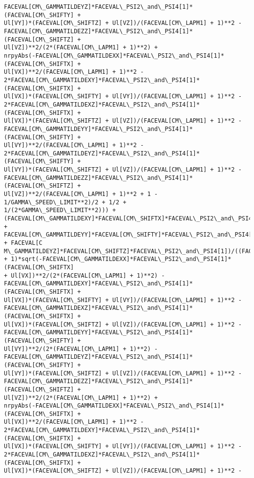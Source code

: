 \documentclass[landscape,letterpaper,10pt,english]{article}
\begin{document}
\begin{Verbatim}[commandchars=\\\{\}]
FACEVAL[CM\_GAMMATILDEYZ]*FACEVAL\_PSI2\_and\_PSI4[1]*(FACEVAL[CM\_SHIFTY] +
Ul[VY])*(FACEVAL[CM\_SHIFTZ] + Ul[VZ])/(FACEVAL[CM\_LAPM1] + 1)**2 -
FACEVAL[CM\_GAMMATILDEZZ]*FACEVAL\_PSI2\_and\_PSI4[1]*(FACEVAL[CM\_SHIFTZ] +
Ul[VZ])**2/(2*(FACEVAL[CM\_LAPM1] + 1)**2) +
nrpyAbs(-FACEVAL[CM\_GAMMATILDEXX]*FACEVAL\_PSI2\_and\_PSI4[1]*(FACEVAL[CM\_SHIFTX] +
Ul[VX])**2/(FACEVAL[CM\_LAPM1] + 1)**2 -
2*FACEVAL[CM\_GAMMATILDEXY]*FACEVAL\_PSI2\_and\_PSI4[1]*(FACEVAL[CM\_SHIFTX] +
Ul[VX])*(FACEVAL[CM\_SHIFTY] + Ul[VY])/(FACEVAL[CM\_LAPM1] + 1)**2 -
2*FACEVAL[CM\_GAMMATILDEXZ]*FACEVAL\_PSI2\_and\_PSI4[1]*(FACEVAL[CM\_SHIFTX] +
Ul[VX])*(FACEVAL[CM\_SHIFTZ] + Ul[VZ])/(FACEVAL[CM\_LAPM1] + 1)**2 -
FACEVAL[CM\_GAMMATILDEYY]*FACEVAL\_PSI2\_and\_PSI4[1]*(FACEVAL[CM\_SHIFTY] +
Ul[VY])**2/(FACEVAL[CM\_LAPM1] + 1)**2 -
2*FACEVAL[CM\_GAMMATILDEYZ]*FACEVAL\_PSI2\_and\_PSI4[1]*(FACEVAL[CM\_SHIFTY] +
Ul[VY])*(FACEVAL[CM\_SHIFTZ] + Ul[VZ])/(FACEVAL[CM\_LAPM1] + 1)**2 -
FACEVAL[CM\_GAMMATILDEZZ]*FACEVAL\_PSI2\_and\_PSI4[1]*(FACEVAL[CM\_SHIFTZ] +
Ul[VZ])**2/(FACEVAL[CM\_LAPM1] + 1)**2 + 1 - 1/GAMMA\_SPEED\_LIMIT**2)/2 + 1/2 +
1/(2*GAMMA\_SPEED\_LIMIT**2))) +
(FACEVAL[CM\_GAMMATILDEXY]*FACEVAL[CM\_SHIFTX]*FACEVAL\_PSI2\_and\_PSI4[1] +
FACEVAL[CM\_GAMMATILDEYY]*FACEVAL[CM\_SHIFTY]*FACEVAL\_PSI2\_and\_PSI4[1] + FACEVAL[C
M\_GAMMATILDEYZ]*FACEVAL[CM\_SHIFTZ]*FACEVAL\_PSI2\_and\_PSI4[1])/((FACEVAL[CM\_LAPM1]
+ 1)*sqrt(-FACEVAL[CM\_GAMMATILDEXX]*FACEVAL\_PSI2\_and\_PSI4[1]*(FACEVAL[CM\_SHIFTX]
+ Ul[VX])**2/(2*(FACEVAL[CM\_LAPM1] + 1)**2) -
FACEVAL[CM\_GAMMATILDEXY]*FACEVAL\_PSI2\_and\_PSI4[1]*(FACEVAL[CM\_SHIFTX] +
Ul[VX])*(FACEVAL[CM\_SHIFTY] + Ul[VY])/(FACEVAL[CM\_LAPM1] + 1)**2 -
FACEVAL[CM\_GAMMATILDEXZ]*FACEVAL\_PSI2\_and\_PSI4[1]*(FACEVAL[CM\_SHIFTX] +
Ul[VX])*(FACEVAL[CM\_SHIFTZ] + Ul[VZ])/(FACEVAL[CM\_LAPM1] + 1)**2 -
FACEVAL[CM\_GAMMATILDEYY]*FACEVAL\_PSI2\_and\_PSI4[1]*(FACEVAL[CM\_SHIFTY] +
Ul[VY])**2/(2*(FACEVAL[CM\_LAPM1] + 1)**2) -
FACEVAL[CM\_GAMMATILDEYZ]*FACEVAL\_PSI2\_and\_PSI4[1]*(FACEVAL[CM\_SHIFTY] +
Ul[VY])*(FACEVAL[CM\_SHIFTZ] + Ul[VZ])/(FACEVAL[CM\_LAPM1] + 1)**2 -
FACEVAL[CM\_GAMMATILDEZZ]*FACEVAL\_PSI2\_and\_PSI4[1]*(FACEVAL[CM\_SHIFTZ] +
Ul[VZ])**2/(2*(FACEVAL[CM\_LAPM1] + 1)**2) +
nrpyAbs(-FACEVAL[CM\_GAMMATILDEXX]*FACEVAL\_PSI2\_and\_PSI4[1]*(FACEVAL[CM\_SHIFTX] +
Ul[VX])**2/(FACEVAL[CM\_LAPM1] + 1)**2 -
2*FACEVAL[CM\_GAMMATILDEXY]*FACEVAL\_PSI2\_and\_PSI4[1]*(FACEVAL[CM\_SHIFTX] +
Ul[VX])*(FACEVAL[CM\_SHIFTY] + Ul[VY])/(FACEVAL[CM\_LAPM1] + 1)**2 -
2*FACEVAL[CM\_GAMMATILDEXZ]*FACEVAL\_PSI2\_and\_PSI4[1]*(FACEVAL[CM\_SHIFTX] +
Ul[VX])*(FACEVAL[CM\_SHIFTZ] + Ul[VZ])/(FACEVAL[CM\_LAPM1] + 1)**2 -

\end{Verbatim}
\end{document}
